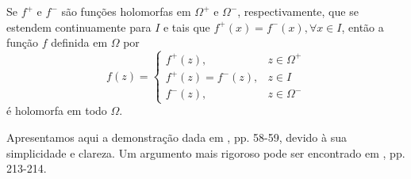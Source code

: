     \begin{teorema}
    \label{teo-principio-simetria}
        Se $f^+$ e $f^-$ são funções holomorfas em $\Omega^+$ e $\Omega^-$, respectivamente,
        que se estendem continuamente para $I$ e tais que $f^+(x) = f^-(x), \forall x\in I$,
        então a função $f$ definida em $\Omega$ por
        \begin{equation*}
            f(z) =  \begin{cases}
                      f^+(z),          & z\in\Omega^+ \\
                      f^+(z) = f^-(z), & z\in I       \\
                      f^-(z),          & z\in\Omega^-
                    \end{cases}
        \end{equation*}
        é holomorfa em todo $\Omega$.
    \end{teorema}
    
    Apresentamos aqui a demonstração dada em \cite{MR1976398}, pp. 58-59, 
    devido à sua simplicidade e clareza. Um argumento mais rigoroso pode ser 
    encontrado em \cite{MR503901}, pp. 213-214.
    
